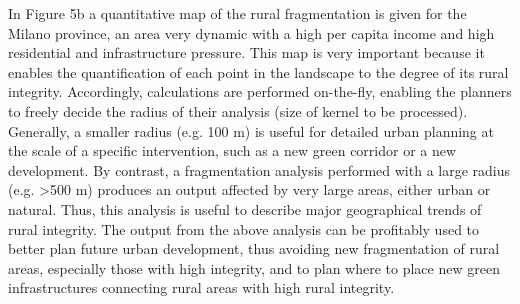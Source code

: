 \documentclass[APA,LATO1COL,doublespace]{WileyNJD-v2}
\begin{document}
In Figure 5b a quantitative map of the rural fragmentation is given for the Milano province, an area very dynamic with a high per capita income and high residential and infrastructure pressure. This map is very important because it enables the quantification of each point in the landscape to the degree of its rural integrity. Accordingly, calculations are performed on-the-fly, enabling the planners to freely decide the radius of their analysis (size of kernel to be processed). Generally, a smaller radius (e.g. 100 m) is useful for detailed urban planning at the scale of a specific intervention, such as a new green corridor or a new development. By contrast, a fragmentation analysis performed with a large radius (e.g. >500 m) produces an output affected by very large areas, either urban or natural. Thus, this analysis is useful to describe major geographical trends of rural integrity.
The output from the above analysis can be profitably used to better plan future urban development, thus avoiding new fragmentation of rural areas, especially those with high integrity, and to plan where to place new green infrastructures connecting rural areas with high rural integrity.
\end{document}
